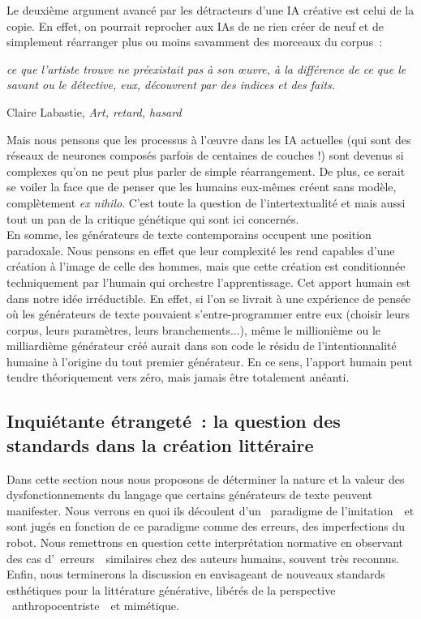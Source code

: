 \documentclass{article}
\newenvironment{citationbox}
{\begin{center}
		\begin{minipage}{.8\textwidth}
		}
		{
		\end{minipage}	
\end{center}
}
\begin{document}
				Le deuxième argument avancé par les détracteurs d'une IA créative est celui de la copie. En effet, on pourrait reprocher aux IAs de ne rien créer de neuf et de simplement réarranger plus ou moins savamment des morceaux du corpus~:
				\begin{citationbox}
					\textit{ce que l'artiste trouve ne
						préexistait pas à son œuvre, à la différence de ce que le savant ou le détective, eux,
						découvrent par des indices et des faits.}
					\begin{flushright}
						Claire Labastie, \textit{Art, retard, hasard} \autocite{labastie2016}
					\end{flushright}
				\end{citationbox}
				Mais nous pensons que les processus à l'œuvre dans les IA actuelles (qui sont des réseaux de neurones composés parfois de centaines de couches !) sont devenus si complexes qu'on ne peut plus parler de simple réarrangement. De plus, ce serait se voiler la face que de penser que les humains eux-mêmes créent sans modèle, complètement \textit{ex nihilo}. C'est toute la question de l'intertextualité et mais aussi tout un pan de la critique génétique qui sont ici concernés.\\
				
				
				En somme, les générateurs de texte contemporains occupent une position paradoxale. Nous pensons en effet que leur complexité les rend capables d'une création à l'image de celle des hommes, mais que cette création est conditionnée techniquement par l'humain qui orchestre l'apprentissage. Cet apport humain est dans notre idée irréductible. En effet, si l'on se livrait à une expérience de pensée où les générateurs de texte pouvaient s'entre-programmer entre eux (choisir leurs corpus, leurs paramètres, leurs branchements...), même le millionième ou le milliardième générateur créé aurait dans son code le résidu de l'intentionnalité humaine à l'origine du tout premier générateur. En ce sens, l'apport humain peut tendre théoriquement vers zéro, mais jamais être totalement anéanti.
				
				
				

		\subsection{Inquiétante étrangeté~: la question des standards dans la création littéraire}
			Dans cette section nous nous proposons de déterminer la nature et la valeur des dysfonctionnements du langage que certains générateurs de texte peuvent manifester. Nous verrons en quoi ils découlent d'un \guillemotleft~paradigme de l'imitation~\guillemotright~et sont jugés en fonction de ce paradigme comme des erreurs, des imperfections du robot. Nous remettrons en question cette interprétation normative en observant des cas d'\guillemotleft~erreurs~\guillemotright~similaires chez des auteurs humains, souvent très reconnus. Enfin, nous terminerons la discussion en envisageant de nouveaux standards esthétiques pour la littérature générative, libérés de la perspective \guillemotleft~anthropocentriste~\guillemotright~et mimétique.
\end{document}
